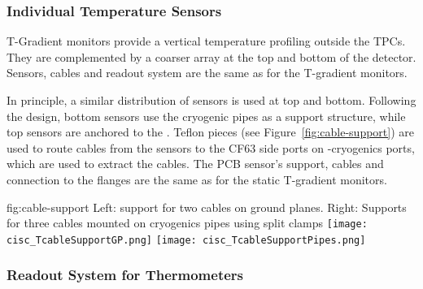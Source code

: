 \subsubsection{Individual Temperature Sensors}

T-Gradient monitors provide a vertical temperature profiling outside the TPCs. They are complemented by a coarser \twod array at the top and bottom of the
detector. Sensors, cables and readout system are the same as for the T-gradient monitors. 

In principle, a similar distribution of sensors is used at top and bottom.
Following the  design, bottom sensors use the cryogenic pipes as a support structure, while top sensors are anchored to the .
Teflon pieces (see Figure~\ref{fig:cable-support}) are used to route cables from the sensors to the CF63 side ports on -cryogenics ports, which are used to extract the cables.
The PCB sensor's support, cables and connection to the flanges are the same as for the static T-gradient monitors. 

\begin{dunefigure}{fig:cable-support}
  {Left: support for two cables on ground planes. Right: Supports for three cables  mounted on cryogenics pipes using split clamps}
  \texttt{[image: cisc\_TcableSupportGP.png]}
  \texttt{[image: cisc\_TcableSupportPipes.png]}
\end{dunefigure}


\subsubsection{Readout System for Thermometers}
\label{sec:fdgen-slow-cryo-therm-readout}

